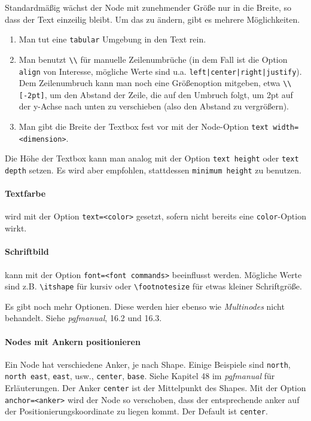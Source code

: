 \documentclass[a4paper,ngerman,10pt]{scrartcl}
\begin{document}
Standardmäßig wächst der Node mit zunehmender Größe nur in die Breite, so dass der Text einzeilig bleibt. Um das zu ändern, gibt es mehrere Möglichkeiten.
\begin{enumerate}
\item Man tut eine \texttt{tabular} Umgebung in den Text rein.
\item Man benutzt \verb!\\! für manuelle Zeilenumbrüche (in dem Fall ist die Option \texttt{align} von Interesse, mögliche Werte sind u.a. \texttt{left|center|right|justify}). Dem Zeilenumbruch kann man noch eine Größenoption mitgeben, etwa \verb!\\[-2pt]!, um den Abstand der Zeile, die auf den Umbruch folgt, um 2pt auf der y-Achse nach unten zu verschieben (also den Abstand zu vergrößern).
\item Man gibt die Breite der Textbox fest vor mit der Node-Option \texttt{text width= <dimension>}.
\end{enumerate}

Die Höhe der Textbox kann man analog mit der Option \texttt{text height} oder \texttt{text depth} setzen. Es wird aber empfohlen, stattdessen \texttt{minimum height} zu benutzen.

\paragraph*{Textfarbe}
wird mit der Option \texttt{text=<color>} gesetzt, sofern nicht bereits eine \texttt{color}-Option wirkt.

\paragraph*{Schriftbild}
kann mit der Option \texttt{font=<font commands>} beeinflusst werden. Mögliche Werte sind z.B. \verb!\itshape! für kursiv oder \verb!\footnotesize! für etwas kleiner Schriftgröße.

Es gibt noch mehr Optionen. Diese werden hier ebenso wie \emph{Multinodes} nicht behandelt. Siehe \emph{pgfmanual}, 16.2 und 16.3.

\paragraph*{Nodes mit Ankern positionieren}
Ein Node hat verschiedene Anker, je nach Shape. Einige Beispiele sind \texttt{north}, \texttt{north east}, \texttt{east}, usw., \texttt{center}, \texttt{base}. Siehe Kapitel 48 im \emph{pgfmanual} für Erläuterungen. Der Anker \texttt{center} ist der Mittelpunkt des Shapes.  Mit der Option \texttt{anchor=<anker>} wird der Node so verschoben, dass der entsprechende anker auf der Positionierungskoordinate zu liegen kommt. Der Default ist \texttt{center}.
\end{document}
